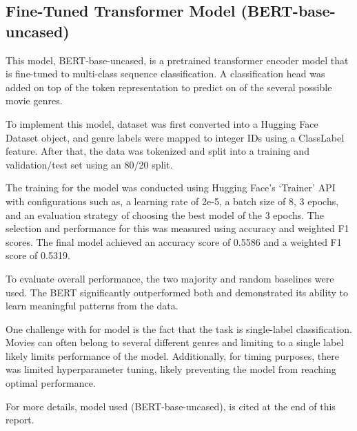 \subsection{Fine-Tuned Transformer Model (BERT-base-uncased)}
This model, BERT-base-uncased, is a pretrained transformer encoder model that is fine-tuned to multi-class sequence classification. A classification head was added on top of the token representation to predict on of the several possible movie genres. 

To implement this model, dataset was first converted into a Hugging Face Dataset object, and genre labels were mapped to integer IDs using a ClassLabel feature. After that, the data was tokenized and split into a training and validation/test set using an 80/20 split. 

The training for the model was conducted using Hugging Face’s ‘Trainer’ API with configurations such as, a learning rate of 2e-5, a batch size of 8, 3 epochs, and an evaluation strategy of choosing the best model of the 3 epochs. The selection and performance for this was measured using accuracy and weighted F1 scores. The final model achieved an accuracy score of 0.5586 and a weighted F1 score of 0.5319. 

To evaluate overall performance, the two majority and random baselines were used. The BERT significantly outperformed both and demonstrated its ability to learn meaningful patterns from the data.

One challenge with for model is the fact that the task is single-label classification. Movies can often belong to several different genres and limiting to a single label likely limits performance of the model. Additionally, for timing purposes, there was limited hyperparameter tuning, likely preventing the model from reaching optimal performance. 

For more details, model used (BERT-base-uncased), is cited at the end of this report.
